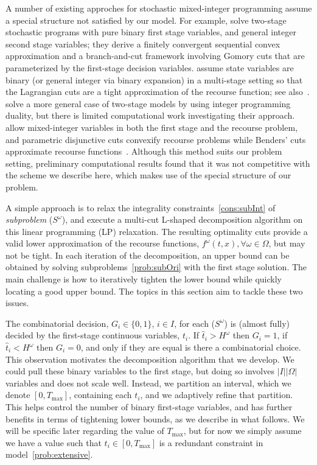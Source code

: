 \documentclass[11pt]{article}
\begin{document}
	A number of existing approches for stochastic mixed-integer programming assume a special structure not satisfied by our model. For example, \citet{gade2014decomposition} solve two-stage stochastic programs with pure binary first stage variables, and general integer second stage variables; they derive a finitely convergent sequential convex approximation and a branch-and-cut framework involving Gomory cuts that are parameterized by the first-stage decision variables. \citet{zou2016nested} assume state variables are binary (or general integer via binary expansion) in a multi-stage setting so that the Lagrangian cuts are a tight approximation of the recourse function; see also~\citet{philpott2016midas}. \citet{caroe1998shaped} solve a more general case of two-stage models by using integer programming duality, but there is limited computational work investigating their approach. \citet{qi2017ancestral} allow mixed-integer variables in both the first stage and the recourse problem, and parametric disjunctive cuts convexify recourse problems while Benders' cuts approximate recourse functions~\citep{chen2012computational}. Although this method suits our problem setting, preliminary computational results found that it was not competitive with the scheme we describe here, which makes use of the special structure of our problem. 
	
	A simple approach is to relax the integrality constraints~\eqref{cons:subInt} of {\em subproblem} ($S^\omega$), and execute a multi-cut L-shaped decomposition algorithm on this linear programming (LP) relaxation. The resulting optimality cuts provide a valid lower approximation of the recourse functions, \(f^\omega(t,x), \forall \omega \in \Omega\), but may not be tight. In each iteration of the decomposition, an upper bound can be obtained by solving subproblems~\eqref{prob:subOri} with the first stage solution. The main challenge is how to iteratively tighten the lower bound while quickly locating a good upper bound. The topics in this section aim to tackle these two issues.
	
	The combinatorial decision, $G_i \in \{0,1\}$,  $i \in I$, for each ($S^\omega$) is (almost fully) decided by the first-stage continuous variables, $t_i$. If $\hat{t}_i > H^\omega$ then $G_i=1$, if $\hat{t}_i < H^\omega$ then $G_i=0$, and only if they are equal is there a combinatorial choice. This observation motivates the decomposition algorithm that we develop. We could pull these binary variables to the first stage, but doing so involves $|I| | \Omega |$ variables and does not scale well. Instead, we partition an interval, which we denote $[0,T_{\max}]$, containing each $t_i$, and we adaptively refine that partition. This helps control the number of binary first-stage variables, and has further benefits in terms of tightening lower bounds, as we describe in what follows. We will be specific later regarding the value of $T_{\max}$, but for now we simply assume we have a value such that $t_i \in [0,T_{\max}]$ is a redundant constraint in model~\eqref{prob:extensive}.  
	
\end{document}
